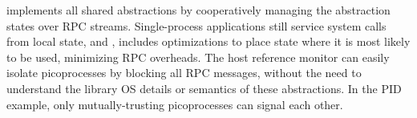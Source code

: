 


\graphene{} implements all shared abstractions by cooperatively managing the abstraction states over RPC streams.
Single-process applications still service system calls from local state, and \graphene{}, includes optimizations to place state where it is most likely to be used, minimizing RPC overheads.
The host reference monitor can easily isolate picoprocesses by 
blocking all RPC messages, %
without the need to understand the library OS details or semantics of these abstractions.
In the PID example, only mutually-trusting picoprocesses can signal each other.



